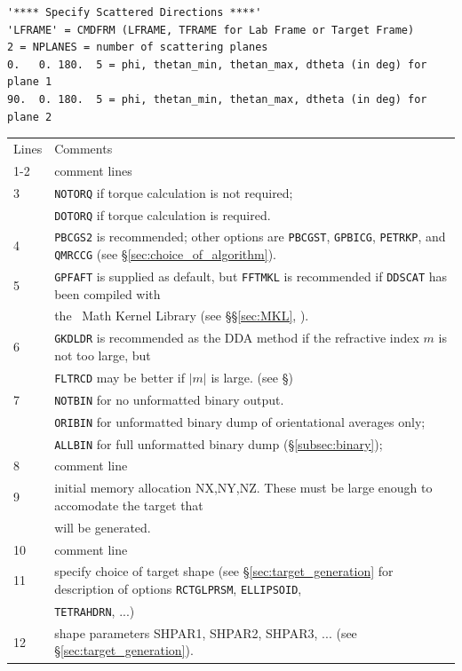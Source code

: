 \begin{appendix}
{\begin{verbatim}
'**** Specify Scattered Directions ****'
'LFRAME' = CMDFRM (LFRAME, TFRAME for Lab Frame or Target Frame)
2 = NPLANES = number of scattering planes
0.   0. 180.  5 = phi, thetan_min, thetan_max, dtheta (in deg) for plane 1
90.  0. 180.  5 = phi, thetan_min, thetan_max, dtheta (in deg) for plane 2
\end{verbatim}
}
{\footnotesize
\begin{tabular}{l l}
Lines	&Comments\\
1-2	&comment lines \\
3	&{\tt NOTORQ} if torque calculation is not required; \\
	&{\tt DOTORQ} if torque calculation is required. \\
4	&{\tt PBCGS2} is recommended; 
	other options are {\tt PBCGST}, {\tt GPBICG}, {\tt PETRKP}, and 
        {\tt QMRCCG} 
        (see \S\ref{sec:choice_of_algorithm}).\\
5	&{\tt GPFAFT} is supplied as default, but {\tt FFTMKL} is recommended 
	if {\tt DDSCAT} has been compiled with\\
	& the \Intel\ Math Kernel Library (see \S\S\ref{sec:MKL},
	\protect{\ref{sec:choice_of_fft}}).\\
6	&{\tt GKDLDR} is recommended as the DDA method if the refractive index
         $m$ is not too large, but\\ 
        & {\tt FLTRCD} may be better if $|m|$ is large.
         (see \S\protect{\ref{sec:DDA_method}})\\
7	&{\tt NOTBIN} for no unformatted binary output.\\
	&{\tt ORIBIN} for unformatted binary dump of orientational averages only; \\
        &{\tt ALLBIN} for full unformatted binary dump (\S\ref{subsec:binary}); \\
8       &comment line \\
9	&initial memory allocation NX,NY,NZ.  These must be large enough to
        accomodate the target that\\
        &will be generated.\\
10	&comment line \\
11	&specify choice of target shape (see \S\ref{sec:target_generation} for
	description of options {\tt RCTGLPRSM}, {\tt ELLIPSOID}, \\
        &{\tt TETRAHDRN}, ...)\\
12	&shape parameters {SHPAR1}, {SHPAR2}, {SHPAR3}, ... 
	(see \S\ref{sec:target_generation}).\\

\end{tabular}}
\end{appendix}
